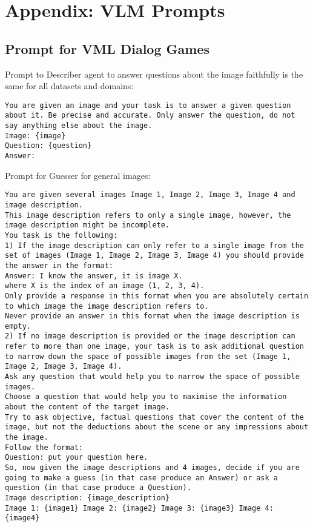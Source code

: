 \section{Appendix: VLM Prompts}
\label{prompts}

\subsection{Prompt for VML Dialog Games}
\label{game-prompts}

Prompt to Describer agent to answer questions about the image faithfully is the same for all datasets and domains:

\begin{lstlisting}
You are given an image and your task is to answer a given question about it. Be precise and accurate. Only answer the question, do not say anything else about the image.
Image: {image}
Question: {question}
Answer:
\end{lstlisting}

Prompt for Guesser for general images:

\begin{lstlisting}
You are given several images Image 1, Image 2, Image 3, Image 4 and image description.
This image description refers to only a single image, however, the image description might be incomplete.
You task is the following:
1) If the image description can only refer to a single image from the set of images (Image 1, Image 2, Image 3, Image 4) you should provide the answer in the format:
Answer: I know the answer, it is image X.
where X is the index of an image (1, 2, 3, 4).
Only provide a response in this format when you are absolutely certain to which image the image description refers to.
Never provide an answer in this format when the image description is empty.
2) If no image description is provided or the image description can refer to more than one image, your task is to ask additional question to narrow down the space of possible images from the set (Image 1, Image 2, Image 3, Image 4).
Ask any question that would help you to narrow the space of possible images.
Choose a question that would help you to maximise the information about the content of the target image.
Try to ask objective, factual questions that cover the content of the image, but not the deductions about the scene or any impressions about the image.
Follow the format:
Question: put your question here.
So, now given the image descriptions and 4 images, decide if you are going to make a guess (in that case produce an Answer) or ask a question (in that case produce a Question).
Image description: {image_description}
Image 1: {image1} Image 2: {image2} Image 3: {image3} Image 4: {image4}
\end{lstlisting}

